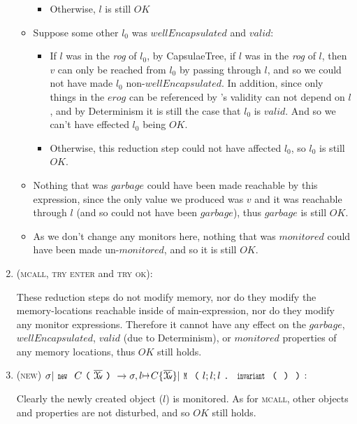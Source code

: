 \begin{enumerate}
\begin{itemize}
\begin{itemize}
		    \item Otherwise, $l$ is still $OK$
    	\end{itemize}

	\item Suppose some other $l_0$ was $wellEncapsulated$ and $valid$:
	\begin{itemize}
			\item If $l$ was in the \emph{rog} of $l_0$, by CapsulaeTree, if $l$ was in the \emph{rog} of $l$, then $v$ can only be reached from $l_0$ by passing through $l$, and so we could not have made $l_0$ non-$wellEncapsulated$. In addition, since only things in the $erog$ can be referenced by \Q@invariant@'s validity can not depend on $l$, and by Determinism it is still the case that $l_0$ is $valid$. And so we can't have effected $l_0$ being $OK$.
			\item Otherwise, this reduction step could not have affected $l_0$, so $l_0$ is still $OK$.
	\end{itemize}


	\item Nothing that was $\mathit{garbage}$ could have been made reachable by this expression, since the only value we produced was $v$ and it was reachable through $l$ (and so could not have been $\mathit{garbage}$), thus $\mathit{garbage}$ is still $OK$.

	\item As we don't change any monitors here, nothing that was $\mathit{monitored}$ could have been made un-$\mathit{monitored}$, and so it is still $OK$.
\end{itemize}

\item (\textsc{mcall}, \textsc{try enter} and \textsc{try ok}):

	These reduction steps do not modify memory, nor do they modify the memory-locations reachable inside of main-expression, nor do they modify any monitor expressions. Therefore it cannot have any effect on the $\mathit{garbage}$, $wellEncapsulated$, $valid$ (due to Determinism), or $\mathit{monitored}$ properties of any memory locations, thus $\mathit{OK}$ still holds.

\item (\textsc{new}) $\sigma|\Kw{new}\ C\oR\vs\cR\rightarrow \sigma,l\mapsto C\{\vs\}| \Kw{M}\oR l;l;l\singleDot\Kw{invariant}\oR\cR\cR$:

	Clearly the newly created object ($l$) is monitored. As for \textsc{mcall}, other objects and properties are not disturbed, and so $\mathit{OK}$ still holds.



\end{enumerate}
